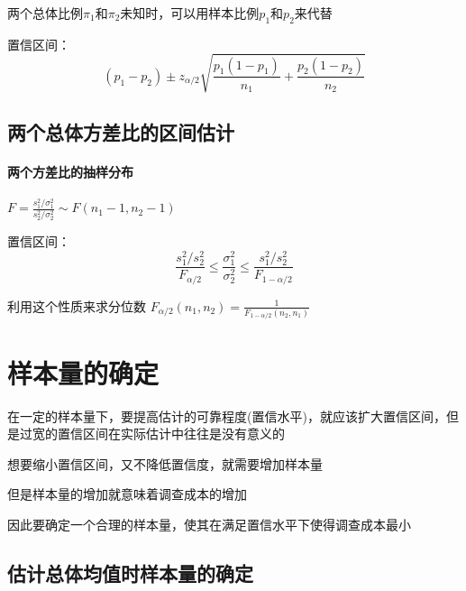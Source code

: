 \documentclass[UTF8,10pt]{book}
\begin{document}


                        {\kaishu 两个总体比例$\pi_1$和$\pi_2$未知时，可以用样本比例$p_1$和$p_2$来代替}

                        {\kaishu 置信区间：}
                        $$   (p_1 - p_2) \pm z_{\alpha / 2}  \sqrt{  \frac{p_1(1-p_1)}{n_1}  +  \frac{p_2(1-p_2)}{n_2}  }  $$


            \subsection{两个总体方差比的区间估计}
                
                \paragraph{两个方差比的抽样分布} $  F = \frac{  s_1^2 / \sigma_1^2  }{  s_2^2 / \sigma_2^2  } \sim F(n_1-1,n_2-1) $
                    
                    {\kaishu 置信区间：}
                        $$   \frac{s_1^2/ s_2^2}{F_{\alpha/2}} \leq  \frac{\sigma_1^2}{\sigma_2^2}  \leq  \frac{s_1^2 / s_2^2}{F_{1-\alpha / 2}}  $$
                        

                    {\kaishu 利用这个性质来求分位数}  $  F_{\alpha/2} (n_1,n_2) =  \frac{1}{F_{1-\alpha/2} (n_2,n_1)} $ 

        
        
        \section{样本量的确定}
                {\kaishu 在一定的样本量下，要提高估计的可靠程度(置信水平)，就应该扩大置信区间，但是过宽的置信区间在实际估计中往往是没有意义的
                
                想要缩小置信区间，又不降低置信度，就需要增加样本量
                
                但是样本量的增加就意味着调查成本的增加
                
                因此要确定一个合理的样本量，使其在满足置信水平下使得调查成本最小}

            \subsection{估计总体均值时样本量的确定}
\end{document}
